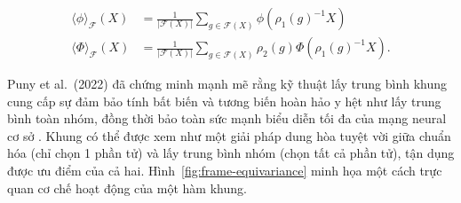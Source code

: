 \begin{align}
    \langle \phi \rangle_\mathcal{F}(X) &= \frac{1}{|\mathcal{F}(X)|} \sum_{g \in \mathcal{F}(X)} \phi(\rho_1(g)^{-1}X) \\
    \langle \Phi \rangle_\mathcal{F}(X) &= \frac{1}{|\mathcal{F}(X)|} \sum_{g \in \mathcal{F}(X)} \rho_2(g)\Phi(\rho_1(g)^{-1}X).
\end{align}

Puny et al.\ (2022) đã chứng minh mạnh mẽ rằng kỹ thuật lấy trung bình khung cung cấp sự đảm bảo tính bất biến và tương biến hoàn hảo y hệt như lấy trung bình toàn nhóm, đồng thời bảo toàn sức mạnh biểu diễn tối đa của mạng neural cơ sở \cite{puny2022frame}. Khung có thể được xem như một giải pháp dung hòa tuyệt vời giữa chuẩn hóa (chỉ chọn 1 phần tử) và lấy trung bình nhóm (chọn tất cả phần tử), tận dụng được ưu điểm của cả hai. Hình~\ref{fig:frame-equivariance} minh họa một cách trực quan cơ chế hoạt động của một hàm khung.

